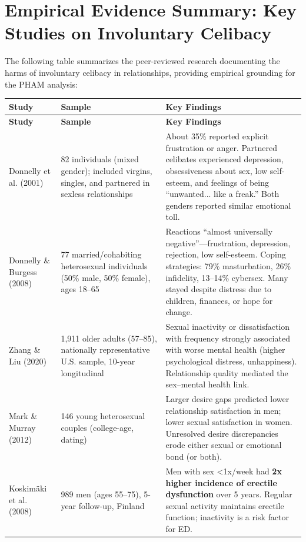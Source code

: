 \documentclass[12pt,openany]{book}
\numberwithin{equation}{chapter}
\begin{document}
\section{Empirical Evidence Summary: Key Studies on Involuntary Celibacy}

The following table summarizes the peer-reviewed research documenting the harms of involuntary celibacy in relationships, providing empirical grounding for the PHAM analysis:

\begin{longtable}{|p{2.8cm}|p{3.5cm}|p{7.5cm}|}
\hline
\textbf{Study} & \textbf{Sample} & \textbf{Key Findings} \\
\hline
\endfirsthead
\hline
\textbf{Study} & \textbf{Sample} & \textbf{Key Findings} \\
\hline
\endhead
\hline
\endfoot

Donnelly et al. (2001) & 82 individuals (mixed gender); included virgins, singles, and partnered in sexless relationships & About 35\% reported explicit frustration or anger. Partnered celibates experienced depression, obsessiveness about sex, low self-esteem, and feelings of being ``unwanted... like a freak.'' Both genders reported similar emotional toll. \\
\hline

Donnelly \& Burgess (2008) & 77 married/cohabiting heterosexual individuals (50\% male, 50\% female), ages 18--65 & Reactions ``almost universally negative''---frustration, depression, rejection, low self-esteem. Coping strategies: 79\% masturbation, 26\% infidelity, 13--14\% cybersex. Many stayed despite distress due to children, finances, or hope for change. \\
\hline

Zhang \& Liu (2020) & 1,911 older adults (57--85), nationally representative U.S. sample, 10-year longitudinal & Sexual inactivity or dissatisfaction with frequency strongly associated with worse mental health (higher psychological distress, unhappiness). Relationship quality mediated the sex--mental health link. \\
\hline

Mark \& Murray (2012) & 146 young heterosexual couples (college-age, dating) & Larger desire gaps predicted lower relationship satisfaction in men; lower sexual satisfaction in women. Unresolved desire discrepancies erode either sexual or emotional bond (or both). \\
\hline

Koskimäki et al. (2008) & 989 men (ages 55--75), 5-year follow-up, Finland & Men with sex \textless1x/week had \textbf{2x higher incidence of erectile dysfunction} over 5 years. Regular sexual activity maintains erectile function; inactivity is a risk factor for ED. \\
\hline


\end{longtable}
\end{document}
